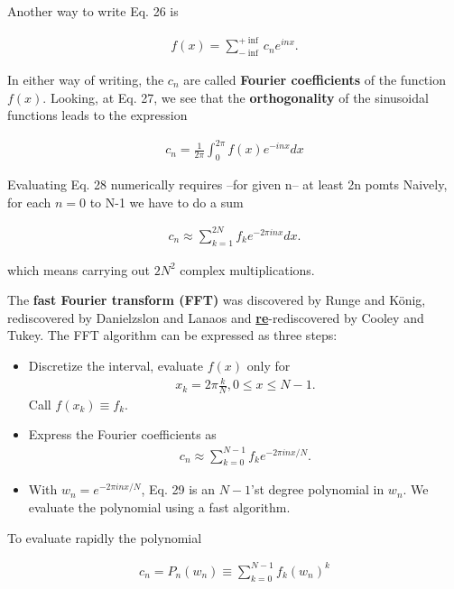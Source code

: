 Another way to write Eq. 26 is

\begin{align}
f(x) = \sum_{-\inf}^{+\inf} c_{n}e^{inx}.
\end{align}

In either way of writing, the $c_{n}$ are called \textbf{Fourier coefficients} of the function $f(x)$. Looking, \eg at Eq. 27, we see that the \textbf{orthogonality} of the sinusoidal functions leads to the expression

\begin{align}
c_{n} = \frac{1}{2\pi}\int_{0}^{2\pi}f(x)e^{-inx}dx
\end{align}

Evaluating Eq. 28 numerically requires --for given n-- at least 2n pomts Naively, for each $n = 0$ to N-1 we have to do a sum

\begin{align}
c_{n} \approx \sum_{k=1}^{2N}f_{k}e^{-2\pi inx}dx .
\end{align}

which means carrying out $2N^2$ complex multiplications.

The \textbf{fast Fourier transform (FFT)} was discovered by Runge and K\"{o}nig, rediscovered by Danielzslon and Lanaos and \textbf{\underline{re}}-rediscovered by Cooley and Tukey. The FFT algorithm can be expressed as three steps:

\begin{itemize}
    \item Discretize the interval, \ie evaluate $f(x)$ only for
    \begin{align}
        x_{k} = 2\pi \frac{k}{N} , 0 \leq x \leq N-1.
    \end{align}
    Call $f(x_k) \equiv f_k$.
    \item   Express the Fourier coefficients as
    \begin{align}
        c_{n} \approx \sum_{k=0}^{N-1}f_{k}e^{-2\pi inx/N} .
    \end{align}
    \item With $w_{n} = e^{-2\pi inx/N}$, Eq. 29 is an $N-1$’st degree polynomial in $w_{n}$. We evaluate the polynomial using a fast algorithm.
\end{itemize}

To evaluate rapidly the polynomial

\begin{align}
    c_{n} = P_{n}(w_{n}) \equiv \sum_{k=0}^{N-1}f_{k}(w_{n})^k
\end{align}

